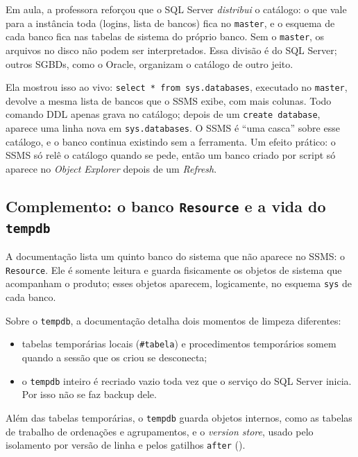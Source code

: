 Em aula, a professora reforçou que o SQL
Server \emph{distribui} o catálogo: o que vale para a instância toda
(logins, lista de bancos) fica no \texttt{master}, e o esquema de cada
banco fica nas tabelas de sistema do próprio banco. Sem o \texttt{master},
os arquivos no disco não podem ser interpretados. Essa divisão é do SQL
Server; outros SGBDs, como o Oracle, organizam o catálogo de outro jeito.

Ela mostrou isso ao vivo: \texttt{select * from sys.databases}, executado
no \texttt{master}, devolve a mesma lista de bancos que o SSMS exibe, com
mais colunas. Todo comando DDL apenas grava no catálogo; depois de um
\texttt{create database}, aparece uma linha nova em \texttt{sys.databases}.
O SSMS é ``uma casca'' sobre esse catálogo, e o banco continua existindo
sem a ferramenta. Um efeito prático: o SSMS só relê o catálogo quando se
pede, então um banco criado por script só aparece no \emph{Object
Explorer} depois de um \emph{Refresh}.

\subsection*{Complemento: o banco \texttt{Resource} e a vida do \texttt{tempdb}}

A documentação lista um quinto banco do sistema que não aparece no SSMS:
o \texttt{Resource}. Ele é somente leitura e
guarda fisicamente os objetos de sistema que acompanham o produto; esses
objetos aparecem, logicamente, no esquema \texttt{sys} de cada banco.

Sobre o \texttt{tempdb}, a documentação detalha dois
momentos de limpeza diferentes:

\begin{itemize}
	\item tabelas temporárias locais (\texttt{\#tabela}) e procedimentos
	temporários somem quando a sessão que os criou se desconecta;
	\item o \texttt{tempdb} inteiro é recriado vazio toda vez que o serviço
	do SQL Server inicia. Por isso não se faz backup dele.
\end{itemize}

Além das tabelas temporárias, o \texttt{tempdb} guarda objetos internos,
como as tabelas de trabalho de ordenações e agrupamentos, e o
\emph{version store}, usado pelo isolamento por versão de linha e pelos
gatilhos \texttt{after} ().


